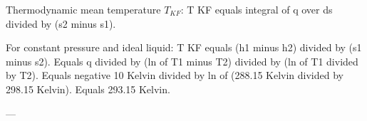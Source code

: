Thermodynamic mean temperature \( T_{KF} \):  
T KF equals integral of q over ds divided by (s2 minus s1).  

For constant pressure and ideal liquid:  
T KF equals (h1 minus h2) divided by (s1 minus s2).  
Equals q divided by (ln of T1 minus T2) divided by (ln of T1 divided by T2).  
Equals negative 10 Kelvin divided by ln of (288.15 Kelvin divided by 298.15 Kelvin).  
Equals 293.15 Kelvin.  

---